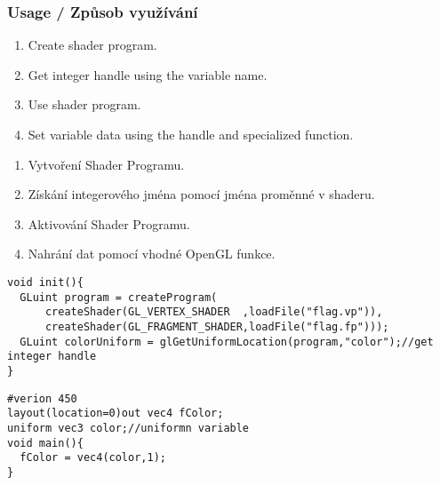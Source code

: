 \begin{frame}[fragile]\frametitle{Usage / Způsob využívání}\scriptsize

  \begin{enumerate}
  \item Create shader program.
  \item Get integer handle using the variable name.
  \item Use shader program.
  \item Set variable data using the handle and specialized function.
  \end{enumerate}

  \begin{enumerate}
  \item Vytvoření Shader Programu.
  \item Získání integerového jména pomocí jména proměnné v shaderu.
  \item Aktivování Shader Programu.
  \item Nahrání dat pomocí vhodné OpenGL funkce.
  \end{enumerate}
{\scriptsize
\begin{verbatim}
void init(){
  GLuint program = createProgram(
      createShader(GL_VERTEX_SHADER  ,loadFile("flag.vp")),
      createShader(GL_FRAGMENT_SHADER,loadFile("flag.fp")));
  GLuint colorUniform = glGetUniformLocation(program,"color");//get integer handle
}
\end{verbatim}
}
{\scriptsize
\begin{verbatim}
#verion 450
layout(location=0)out vec4 fColor;
uniform vec3 color;//uniformn variable
void main(){
  fColor = vec4(color,1);
}
\end{verbatim}
}
\end{frame}


